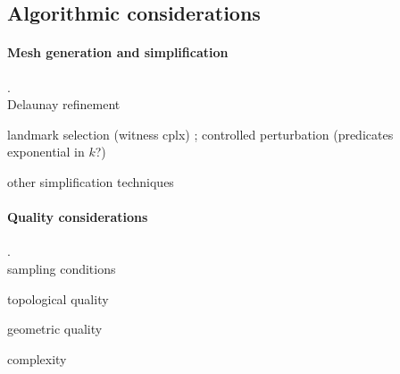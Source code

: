 

\subsection*{Algorithmic considerations}

\paragraph{Mesh generation and simplification} .\\

Delaunay refinement 

landmark selection (witness cplx) ;  controlled perturbation
(predicates exponential in $k$?)

other simplification techniques

\paragraph{Quality considerations} .\\

sampling conditions

topological quality

geometric quality

complexity


